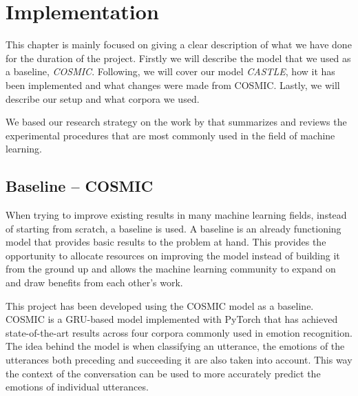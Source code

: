 \documentclass[nofilelist]{cslthse-msc}
\begin{document}





\chapter{Implementation}
This chapter is mainly focused on giving a clear description of what we have done for the duration of the project. Firstly we will describe the model that we used as a baseline, \textit{COSMIC}. Following, we will cover our model \textit{CASTLE}, how it has been implemented and what changes were made from COSMIC. Lastly, we will describe our setup and what corpora we used. 

We based our research strategy on the work by \citet{bouthillier:hal-02447823} that summarizes and reviews the experimental procedures that are most commonly used in the field of machine learning.

\section{Baseline -- COSMIC}
When trying to improve existing results in many machine learning fields, instead of starting from scratch, a baseline is used. A baseline is an already functioning model that provides basic results to the problem at hand. This provides the opportunity to allocate resources on improving the model instead of building it from the ground up and allows the machine learning community to expand on and draw benefits from each other's work. 

This project has been developed using the COSMIC model \citep{ghosal2020cosmic} as a baseline. COSMIC is a GRU-based model implemented with PyTorch that has achieved state-of-the-art results across four corpora commonly used in emotion recognition. The idea behind the model is when classifying an utterance, the emotions of the utterances both preceding and succeeding it are also taken into account. This way the context of the conversation can be used to more accurately predict the emotions of individual utterances. 
\end{document}
